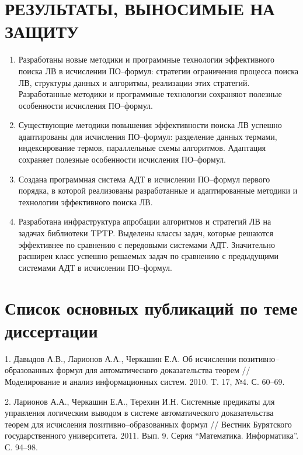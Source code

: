 \documentclass[a4paper]{report}
\begin{document}
\section*{РЕЗУЛЬТАТЫ, ВЫНОСИМЫЕ НА ЗАЩИТУ}
\begin{enumerate}
\item Разработаны новые методики и программные технологии эффективного поиска ЛВ в исчислении ПО--формул: стратегии ограничения процесса поиска ЛВ, структуры данных и алгоритмы, реализации этих стратегий.  Разработанные методики и программные технологии сохраняют полезные особенности исчисления ПО--формул.

\item Существующие методики повышения эффективности поиска ЛВ успешно адаптированы для исчисления ПО--формул: разделение данных термами, индексирование термов, параллельные схемы алгоритмов. Адаптация сохраняет полезные особенности исчисления ПО--формул.

\item Создана программная система АДТ в исчислении ПО--формул первого порядка, в которой реализованы разработанные и адаптированные методики и технологии эффективного поиска ЛВ.

\item Разработана инфраструктура апробации алгоритмов и стратегий ЛВ на задачах библиотеки TPTP. Выделены классы задач, которые решаются эффективнее по сравнению с  передовыми системами АДТ. Значительно расширен класс успешно решаемых задач по сравнению с предыдущими системами АДТ в исчислении ПО--формул.

\end{enumerate}



\section*{Список основных публикаций по теме диссертации}

1. Давыдов А.В., Ларионов А.А., Черкашин Е.А. Об исчислении
позитивно--образованных формул для автоматического доказательства
теорем // Моделирование и анализ информационных систем. 2010. T. 17, №4. С. 60--69.

2. Ларионов А.А., Черкашин Е.А., Терехин И.Н. Системные предикаты для
управления логическим выводом в системе автоматического доказательства
теорем для исчисления позитивно--образованных формул // Вестник
Бурятского государственного университета. 2011. Вып. 9. Серия
``Математика. Информатика''. С. 94--98.
\end{document}

